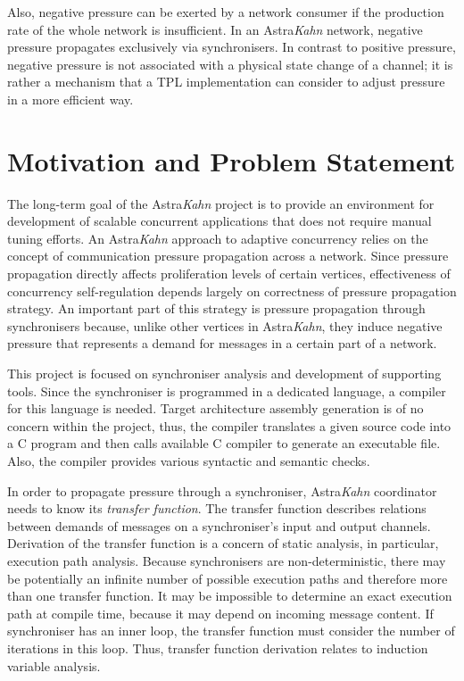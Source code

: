 \documentclass{article}
\begin{document}
Also, negative pressure can be exerted by a network consumer if the production rate of the whole network is insufficient. In an Astra\emph{Kahn} network, negative pressure propagates exclusively via synchronisers. In contrast to positive pressure, negative pressure is not associated with a physical state change of a channel; it is rather a mechanism that a TPL implementation can consider to adjust pressure in a more efficient way.

\section{Motivation and Problem Statement}
The long-term goal of the Astra\emph{Kahn} project is to provide an environment for development of scalable concurrent applications that does not require manual tuning efforts. An Astra\emph{Kahn} approach to adaptive concurrency relies on the concept of communication pressure propagation across a network. Since pressure propagation directly affects proliferation levels of certain vertices, effectiveness of concurrency self-regulation depends largely on correctness of pressure propagation strategy. An important part of this strategy is pressure propagation through synchronisers because, unlike other vertices in Astra\emph{Kahn}, they induce negative pressure that represents a demand for messages in a certain part of a network.

This project is focused on synchroniser analysis and development of supporting tools. Since the synchroniser is programmed in a dedicated language, a compiler for this language is needed. Target architecture assembly generation is of no concern within the project, thus, the compiler translates a given source code into a C program and then calls available C compiler to generate an executable file. Also, the compiler provides various syntactic and semantic checks.

In order to propagate pressure through a synchroniser, Astra\emph{Kahn} coordinator needs to know its \emph{transfer function}. The transfer function describes relations between demands of messages on a synchroniser's input and output channels. Derivation of the transfer function is a concern of static analysis, in particular, execution path analysis. Because synchronisers are non-deterministic, there may be potentially an infinite number of possible execution paths and therefore more than one transfer function. It may be impossible to determine an exact execution path at compile time, because it may depend on incoming message content. If synchroniser has an inner loop, the transfer function must consider the number of iterations in this loop. Thus, transfer function derivation relates to induction variable analysis.
\end{document}
